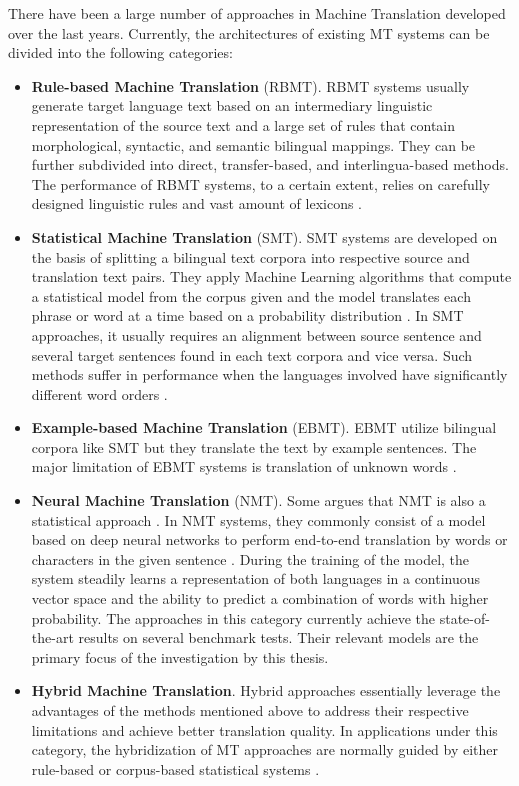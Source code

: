 There have been a large number of approaches in Machine Translation developed over the last years. Currently, the architectures of existing MT systems can be divided into the following categories: 
\medskip  
\begin{itemize}
\item \textbf{Rule-based Machine Translation} (RBMT). RBMT systems usually generate target language text based on an intermediary linguistic representation of the source text and a large set of rules that contain morphological, syntactic, and semantic bilingual mappings. They can be further subdivided into direct, transfer-based, and interlingua-based methods. The performance of RBMT systems, to a certain extent, relies on carefully designed linguistic rules and vast amount of lexicons \cite{Moussallem2017}.
\item \textbf{Statistical Machine Translation} (SMT). SMT systems are developed on the basis of splitting a bilingual text corpora into respective source and translation text pairs. They apply Machine Learning algorithms that compute a statistical model from the corpus given and the model translates each phrase or word at a time based on a probability distribution \cite{Moussallem2017}. In SMT approaches, it usually requires an alignment between source sentence and several target sentences found in each text corpora and vice versa. Such methods suffer in performance when the languages involved have significantly different word orders \cite{okpor2014machine}.
\item \textbf{Example-based Machine Translation} (EBMT). EBMT utilize bilingual corpora like SMT but they translate the text by example sentences. The major limitation of EBMT systems is translation of unknown words \cite{Moussallem2017}. 
\item \textbf{Neural Machine Translation} (NMT). Some argues that NMT is also a statistical approach \cite{Moussallem2017}. In NMT systems, they commonly consist of a model based on deep neural networks to perform end-to-end translation by words or characters in the given sentence \cite{Moussallem2017}. During the training of the model, the system steadily learns a representation of both languages in a continuous vector space and the ability to predict a combination of words with higher probability. The approaches in this category currently achieve the state-of-the-art results on several benchmark tests. Their relevant models are the primary focus of the investigation by this thesis.
\item \textbf{Hybrid Machine Translation}. Hybrid approaches essentially leverage the advantages of the methods mentioned above to address their respective limitations and achieve better translation quality. In applications under this category, the hybridization of MT approaches are normally guided by either rule-based or corpus-based statistical systems \cite{costa2015latest}.
\end{itemize}

